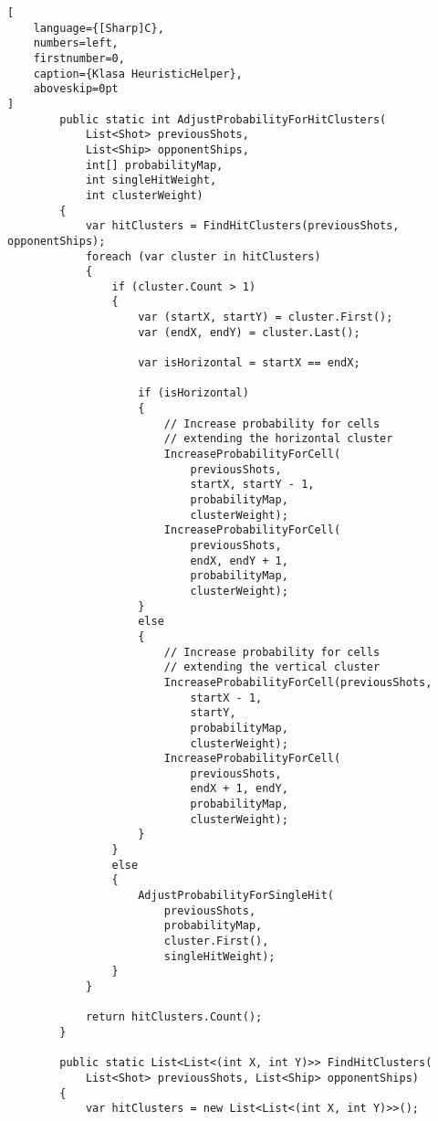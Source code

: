 \begin{addmargin}[0mm]{0mm}
\begin{lstlisting}[
    language={[Sharp]C},
    numbers=left,
    firstnumber=0,
    caption={Klasa HeuristicHelper},
    aboveskip=0pt
]
        public static int AdjustProbabilityForHitClusters(
            List<Shot> previousShots,
            List<Ship> opponentShips,
            int[] probabilityMap,
            int singleHitWeight,
            int clusterWeight)
        {
            var hitClusters = FindHitClusters(previousShots, opponentShips);
            foreach (var cluster in hitClusters)
            {
                if (cluster.Count > 1)
                {
                    var (startX, startY) = cluster.First();
                    var (endX, endY) = cluster.Last();

                    var isHorizontal = startX == endX;

                    if (isHorizontal)
                    {
                        // Increase probability for cells
                        // extending the horizontal cluster
                        IncreaseProbabilityForCell(
                            previousShots,
                            startX, startY - 1,
                            probabilityMap, 
                            clusterWeight);
                        IncreaseProbabilityForCell(
                            previousShots,
                            endX, endY + 1,
                            probabilityMap,
                            clusterWeight);
                    }
                    else
                    {
                        // Increase probability for cells
                        // extending the vertical cluster
                        IncreaseProbabilityForCell(previousShots,
                            startX - 1,
                            startY,
                            probabilityMap, 
                            clusterWeight);
                        IncreaseProbabilityForCell(
                            previousShots,
                            endX + 1, endY,
                            probabilityMap,
                            clusterWeight);
                    }
                }
                else
                {
                    AdjustProbabilityForSingleHit(
                        previousShots,
                        probabilityMap,
                        cluster.First(),
                        singleHitWeight);
                }
            }

            return hitClusters.Count();
        }

        public static List<List<(int X, int Y)>> FindHitClusters(
            List<Shot> previousShots, List<Ship> opponentShips)
        {
            var hitClusters = new List<List<(int X, int Y)>>();


\end{lstlisting}
\end{addmargin}
